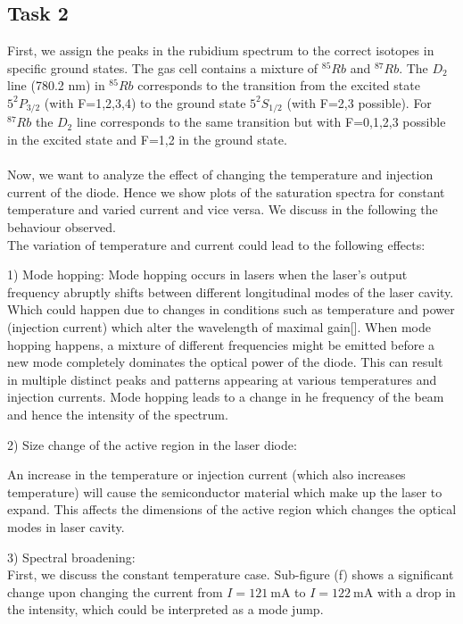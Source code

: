 \documentclass{article}
\begin{document}
\subsection{Task 2}
First, we assign the peaks in the rubidium spectrum to the correct isotopes in specific ground states. The gas cell contains a mixture of $^{85}Rb$ and $^{87}Rb$. The $D_2$ line (780.2 nm) in $^{85}Rb$ corresponds to the transition from the excited state $5^2P_{3/2}$ (with F=1,2,3,4) to the ground state $5^2S_{1/2}$ (with F=2,3 possible). For $^{87}Rb$ the $D_2$ line corresponds to the same transition but with F=0,1,2,3 possible in the excited state and F=1,2 in the ground state.
\\\\
Now, we want to analyze the effect of changing the temperature and injection current of the diode. Hence we show plots of the saturation spectra for constant temperature and varied current and vice versa. We discuss in the following the behaviour observed. 
\\
The variation of temperature and current could lead to the following effects: 

1) Mode hopping: Mode hopping occurs in lasers when the laser's output frequency abruptly shifts between different longitudinal modes of the laser cavity. Which could happen due to changes in conditions such as temperature and power (injection current) which alter the wavelength of maximal gain[]. When mode hopping happens, a mixture of different frequencies might be emitted before a new mode completely dominates the optical power of the diode. This can result in multiple distinct peaks and patterns appearing at various temperatures and injection currents. Mode hopping leads to a change in he frequency of the beam and hence the intensity of the spectrum. 

2) Size change of the active region in the laser diode: 

An increase in the temperature or injection current (which also increases temperature) will cause the semiconductor material which make up the laser to expand. This affects the dimensions of the active region which changes the optical modes in laser cavity.

3) Spectral broadening: 
\\
First, we discuss the constant temperature case. Sub-figure (f) shows a significant change upon changing the current from $I = \SI{121}{\mA}$ to $I = \SI{122}{\mA}$ with a drop in the intensity, which could be interpreted as a mode jump. 
\end{document}
